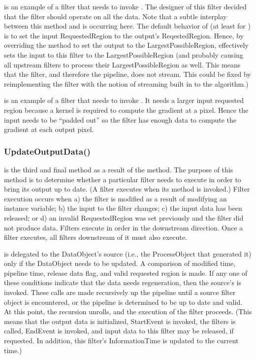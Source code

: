 is an example of a filter that needs to
invoke . The designer of this
filter decided that the filter should operate on all the data. Note
that a subtle interplay between this method and
 is occurring here. The default
behavior of  (at least for
) is to set the input RequestedRegion to
the output's ReqestedRegion. Hence, by overriding the method
 to set the output to the
LargestPossibleRegion, effectively sets the input to this filter to
the LargestPossibleRegion (and probably causing all upstream filters
to process their LargestPossibleRegion as well. This means that the
filter, and therefore the pipeline, does not stream. This could be
fixed by reimplementing the filter with the notion of streaming built
in to the algorithm.)

 is an example of a filter that needs to
invoke . It needs a larger input requested
region because a kernel is required to compute the gradient at a pixel. Hence
the input needs to be ``padded out'' so the filter has enough data to compute
the gradient at each output pixel.

\subsubsection{UpdateOutputData()}
\label{sec:UpdateOutputData}

 is the third and final method as a result of the
 method. The purpose of this method is to determine whether a
particular filter needs to execute in order to bring its output up to date. (A
filter executes when its  method is invoked.) Filter
execution occurs when a) the filter is modified as a result of modifying an
instance variable; b) the input to the filter changes; c) the input data has
been released; or d) an invalid RequestedRegion was set previously and the
filter did not produce data. Filters execute in order in the downstream
direction.  Once a filter executes, all filters downstream of it must also
execute.

 is delegated to the DataObject's source
(i.e., the ProcessObject that generated it) only if the DataObject needs to be
updated. A comparison of modified time, pipeline time, release data flag, and
valid requested region is made. If any one of these conditions indicate that
the data needs regeneration, then the source's
 is invoked. These calls are made
recursively up the pipeline until a source filter object is encountered, or the
pipeline is determined to be up to date and valid. At this point, the recursion
unrolls, and the execution of the filter proceeds. (This means that the output
data is initialized, StartEvent is invoked, the filters 
is called, EndEvent is invoked, and input data to this filter may be released,
if requested. In addition, this filter's InformationTime is updated to the
current time.)

